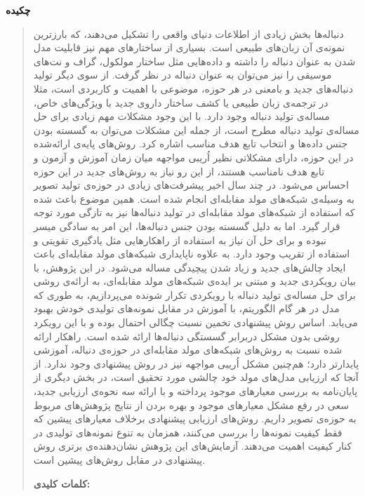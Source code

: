 \thispagestyle{empty}
\centerline{\textbf{\large{چکیده}}}
\begin{quote}
دنباله‌ها بخش زیادی از اطلاعات دنیای واقعی را تشکیل می‌دهند، که بارزترین نمونه‌ی آن زبان‌های طبیعی است. بسیاری از ساختارهای مهم نیز قابلیت مدل شدن به عنوان دنباله را داشته و داده‌هایی مثل ساختار مولکول، گراف و نت‌های موسیقی را نیز می‌توان به عنوان دنباله در نظر گرفت. از سوی دیگر تولید دنباله‌های جدید و بامعنی در هر حوزه، موضوعی با اهمیت و کاربردی است، مثلا در ترجمه‌ی زبان طبیعی یا کشف ساختار داروی جدید با ویژگی‌های خاص، مساله‌ی تولید دنباله وجود دارد.
با این وجود مشکلات مهم زیادی برای حل مساله‌ی تولید دنباله مطرح است، از جمله این مشکلات می‌توان به گسسته بودن جنس داده‌ها و انتخاب تابع هدف مناسب اشاره کرد. 
روش‌های پایه‌ی ارائه‌شده در این حوزه، دارای مشکلاتی نظیر اُریبی مواجهه میان زمان آموزش و آزمون و تابع هدف نامناسب هستند، از این رو نیاز به روش‌های جدید در این حوزه احساس می‌شود.
\newline  
در چند سال اخیر پیشرفت‌های زیادی در حوزه‌ی تولید تصویر  به وسیله‌ی شبکه‌های مولد مقابله‌ای انجام شده است. همین موضوع باعث شده که استفاده از شبکه‌های مولد مقابله‌ای در تولید دنباله‌ها نیز به تازگی مورد توجه قرار گیرد.  اما به دلیل گسسته بودن جنس دنباله‌ها، این امر به سادگی میسر نبوده و برای حل آن نیاز به استفاده از راهکار‌هایی مثل یادگیری تقویتی و استفاده از تقریب وجود دارد.
به علاوه ناپایداری شبکه‌های مولد مقابله‌ای باعث ایجاد چالش‌های جدید و زیاد شدن پیچیدگی مساله می‌شود.
\newline
در این پژوهش، با بیان رویکردی جدید و مبتنی بر ایده‌ی شبکه‌های مولد مقابله‌ای، به ارائه‌ی روشی برای حل مساله‌ی تولید دنباله با رویکردی تکرار شونده می‌پردازیم، به طوری که مدل در هر گام الگوریتم، با آموزش در مقابل نمونه‌های تولیدی خودش بهبود می‌یابد.
اساس روش پیشنهادی تخمین نسبت چگالی احتمال بوده و با این رویکرد روشی بدون مشکل دربرابر گسستگی دنباله‌ها ارائه شده است.
راهکار ارا‌‌ئه شده نسبت به روش‌های شبکه‌های مولد مقابله‌ای در حوزه‌ی دنباله، آموزشی پایدار‌تر دارد؛ هم‌چنین مشکل اُریبی مواجهه نیز در روش پیشنهادی وجود ندارد.
\newline
از آنجا که ارزیابی مدل‌های مولد خود چالشی مورد تحقیق است، در بخش دیگری از پایان‌نامه به بررسی معیارهای موجود پرداخته و با ارائه سه نحوه‌ی ارزیابی جدید، سعی در رفع مشکل معیار‌های موجود و بهره بردن از نتایج پژوهش‌های مربوط به حوزه‌ی تصویر داریم. روش‌های ارزیابی پیشنهادی برخلاف معیار‌های پیشین که فقط کیفیت نمونه‌ها را بررسی می‌کنند، همزمان به تنوع نمونه‌های تولیدی در کنار کیفیت اهمیت می‌دهند.
آزمایش‌های این پژوهش نشان‌دهنده‌ی برتری روش پیشنهادی در مقابل روش‌های پیشین است.


\vskip 1cm
\textbf{کلمات کلیدی:} 
\end{quote}
